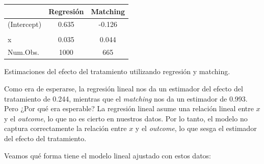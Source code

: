 \documentclass[
  letterpaper,
  DIV=11,
  numbers=noendperiod,
  oneside]{scrreprt}
\begin{document}
\begin{table}
\fontsize{12.0pt}{14.4pt}\selectfont
\begin{tabular*}{\linewidth}{@{\extracolsep{\fill}}lcc}
\toprule
  & Regresión & Matching \\ 
\midrule\addlinespace[2.5pt]
(Intercept) & 0.635 & -0.126 \\ 
{\bfseries \cellcolor[HTML]{rgba(255,255,224,0.8)}{\textcolor[HTML]{000000}{Tratamiento}}} & {\bfseries \cellcolor[HTML]{rgba(255,255,224,0.8)}{\textcolor[HTML]{000000}{0.244}}} & {\bfseries \cellcolor[HTML]{rgba(255,255,224,0.8)}{\textcolor[HTML]{000000}{0.993}}} \\ 
{x} & {0.035} & {0.044} \\ 
Num.Obs. & 1000 & 665 \\ 
\bottomrule
\end{tabular*}
\end{table}

Estimaciones del efecto del tratamiento utilizando regresión y matching.

Como era de esperarse, la regresión lineal nos da un estimador del
efecto del tratamiento de 0.244, mientras que el \emph{matching} nos da
un estimador de 0.993. Pero ¿Por qué era esperable? La regresión lineal
asume una relación lineal entre \(x\) y el \emph{outcome}, lo que no es
cierto en nuestros datos. Por lo tanto, el modelo no captura
correctamente la relación entre \(x\) y el \emph{outcome}, lo que sesga
el estimador del efecto del tratamiento.

Veamos qué forma tiene el modelo lineal ajustado con estos datos:
\end{document}

